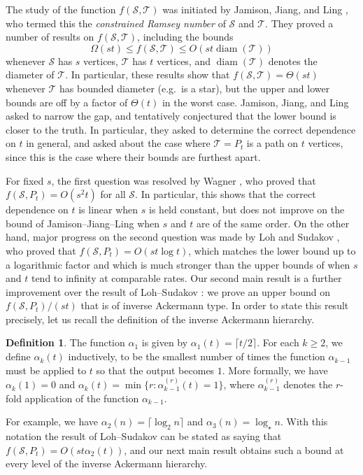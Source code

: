 \documentclass[a4paper,11pt]{article}
\theoremstyle{definition}
\newtheorem{definition}[theorem]{\bf Definition}
\def\cS{\mathcal{S}}
\def\cT{\mathcal{T}}
\DeclareMathOperator{\diam}{diam}
\begin{document}
The study of the function $f(\cS,\cT)$ was initiated by Jamison, Jiang, and Ling \cite{MR1943103}, who termed this the \emph{constrained Ramsey number} of $\cS$ and $\cT$. They proved a number of results on $f(\cS,\cT)$, including the bounds
\[\Omega(st) \leq f(\cS,\cT) \leq O(st\diam(\cT))\]
whenever $\cS$ has $s$ vertices, $\cT$ has $t$ vertices, and $\diam(\cT)$ denotes the diameter of $\cT$. In particular, these results show that $f(\cS,\cT) = \Theta(st)$ whenever $\cT$ has bounded diameter (e.g.\ is a star), but the upper and lower bounds are off by a factor of $\Theta(t)$ in the worst case. Jamison, Jiang, and Ling \cite{MR1943103} asked to narrow the gap, and tentatively conjectured that the lower bound is closer to the truth. In particular, they asked to determine the correct dependence on $t$ in general, and asked about the case where $\cT = P_t$ is a path on $t$ vertices, since this is the case where their bounds are furthest apart.

For fixed $s$, the first question was resolved by Wagner \cite{MR2238050}, who proved that $f(\cS, P_t) = O(s^2 t)$ for all $\cS$. In particular, this shows that the correct dependence on $t$ is linear when $s$ is held constant, but does not improve on the bound of Jamison--Jiang--Ling \cite{MR1943103} when $s$ and $t$ are of the same order. On the other hand, major progress on the second question was made by Loh and Sudakov \cite{LS09}, who proved that $f(\cS, P_t) = O(st \log t)$, which matches the lower bound up to a logarithmic factor and which is much stronger than the upper bounds of \cite{MR1943103,MR2238050} when $s$ and $t$ tend to infinity at comparable rates. Our second main result is a further improvement over the result of Loh--Sudakov \cite{LS09}: we prove an upper bound on $f(\cS, P_t)/(st)$ that is of inverse Ackermann type. In order to state this result precisely, let us recall the definition of the inverse Ackermann hierarchy.
\begin{definition}
The function $\alpha_1$ is given by $\alpha_1(t)=\lceil t/2\rceil$. For each $k\geq 2$, we define $\alpha_k(t)$ inductively, to be the smallest number of times the function $\alpha_{k-1}$ must be applied to $t$ so that the output becomes $1$. More formally, we have $\alpha_k(1)=0$ and $\alpha_k(t)=\min\{r: \alpha_{k-1}^{(r)}(t)=1\}$, where $\alpha_{k-1}^{(r)}$ denotes the $r$-fold application of the function $\alpha_{k-1}$.
\end{definition}

For example, we have $\alpha_2(n)=\lceil \log_2 n\rceil$ and $\alpha_3(n)=\log_\star n$. 
With this notation the result of Loh--Sudakov can be stated as saying that $f(\cS, P_t) = O(st \alpha_2(t))$, and our next main result obtains such a bound at every level of the inverse Ackermann hierarchy.
\end{document}
